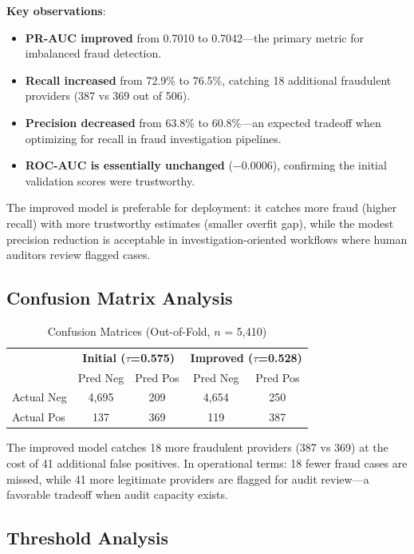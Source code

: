 \documentclass[conference]{IEEEtran}
\begin{document}
\textbf{Key observations}:
\begin{itemize}[leftmargin=*]
    \item \textbf{PR-AUC improved} from 0.7010 to 0.7042---the primary metric for imbalanced fraud detection.
    \item \textbf{Recall increased} from 72.9\% to 76.5\%, catching 18 additional fraudulent providers (387 vs 369 out of 506).
    \item \textbf{Precision decreased} from 63.8\% to 60.8\%---an expected tradeoff when optimizing for recall in fraud investigation pipelines.
    \item \textbf{ROC-AUC is essentially unchanged} ($-$0.0006), confirming the initial validation scores were trustworthy.
\end{itemize}

The improved model is preferable for deployment: it catches more fraud (higher recall) with more trustworthy estimates (smaller overfit gap), while the modest precision reduction is acceptable in investigation-oriented workflows where human auditors review flagged cases.

\subsection{Confusion Matrix Analysis}

\begin{table}[h]
\caption{Confusion Matrices (Out-of-Fold, $n$ = 5,410)}
\label{tab:confusion}
\centering
\small
\begin{tabular}{@{}l|cc|cc@{}}
\toprule
& \multicolumn{2}{c|}{\textbf{Initial ($\tau$=0.575)}} & \multicolumn{2}{c}{\textbf{Improved ($\tau$=0.528)}} \\
& Pred Neg & Pred Pos & Pred Neg & Pred Pos \\
\midrule
Actual Neg & 4,695 & 209 & 4,654 & 250 \\
Actual Pos & 137 & 369 & 119 & 387 \\
\bottomrule
\end{tabular}
\vspace{-1mm}
\end{table}

The improved model catches 18 more fraudulent providers (387 vs 369) at the cost of 41 additional false positives. In operational terms: 18 fewer fraud cases are missed, while 41 more legitimate providers are flagged for audit review---a favorable tradeoff when audit capacity exists.

\subsection{Threshold Analysis}
\end{document}
